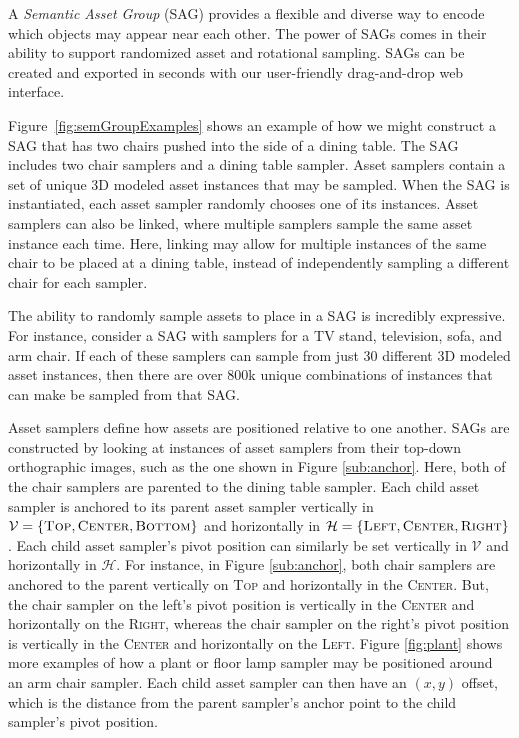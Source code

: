 A \textit{Semantic Asset Group} (SAG) provides a flexible and diverse way to encode which objects may appear near each other. The power of SAGs comes in their ability to support randomized asset and rotational sampling. SAGs can be created and exported in seconds with our user-friendly drag-and-drop web interface.

Figure~\ref{fig:semGroupExamples} shows an example of how we might construct a SAG that has two chairs pushed into the side of a dining table. The SAG includes two chair samplers and a dining table sampler. Asset samplers contain a set of unique 3D modeled asset instances that may be sampled. When the SAG is instantiated, each asset sampler randomly chooses one of its instances. Asset samplers can also be linked, where multiple samplers sample the same asset instance each time. Here, linking may allow for multiple instances of the same chair to be placed at a dining table, instead of independently sampling a different chair for each sampler.

The ability to randomly sample assets to place in a SAG is incredibly expressive. For instance, consider a SAG with samplers for a TV stand, television, sofa, and arm chair. If each of these samplers can sample from just 30 different 3D modeled asset instances, then there are over $800$k unique combinations of instances that can make be sampled from that SAG. 

Asset samplers define how assets are positioned relative to one another. SAGs are constructed by looking at instances of asset samplers from their top-down orthographic images, such as the one shown in Figure \ref{sub:anchor}. Here, both of the chair samplers are parented to the dining table sampler. Each child asset sampler is anchored to its parent asset sampler vertically in $\mathcal V = \{\textsc{Top}, \textsc{Center}, \textsc{Bottom}\}$ and horizontally in $\mathcal H = \{\textsc{Left}, \textsc{Center}, \textsc{Right}\}$. Each child asset sampler's pivot position can similarly be set vertically in $\mathcal V$ and horizontally in $\mathcal H$. For instance, in Figure \ref{sub:anchor}, both chair samplers are anchored to the parent vertically on \textsc{Top} and horizontally in the \textsc{Center}. But, the chair sampler on the left's pivot position is vertically in the \textsc{Center} and horizontally on the \textsc{Right}, whereas the chair sampler on the right's pivot position is vertically in the \textsc{Center} and horizontally on the \textsc{Left}. Figure \ref{fig:plant} shows more examples of how a plant or floor lamp sampler may be positioned around an arm chair sampler. Each child asset sampler can then have an $(x, y)$ offset, which is the distance from the parent sampler's anchor point to the child sampler's pivot position.


